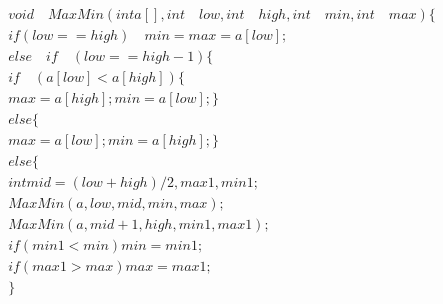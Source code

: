 \documentclass{book}
\begin{document}
\begin{align*}
 void \quad MaxMin(int a[], int \quad low , int \quad high , int \quad min , int \quad max) \lbrace \\
 if(low==high) \quad min=max=a[low]; \\
 else\quad if \quad (low==high-1) \lbrace \\
 if \quad (a[low] < a[high]) \lbrace \\
 max = a[high]; min= a[low];  \rbrace \\
 else \lbrace \\
 max=a[low]; min=a[high]; \rbrace \\
 else \lbrace \\
 int mid = (low+high)/2 , max1,min1;\\ 
 MaxMin(a,low,mid,min,max); \\
 MaxMin(a,mid+1,high,min1,max1);\\
 if(min1<min) min=min1 ; \\
  if(max1> max) max=max1 ; \\
 \rbrace \\
\end{align*}
\end{document}
